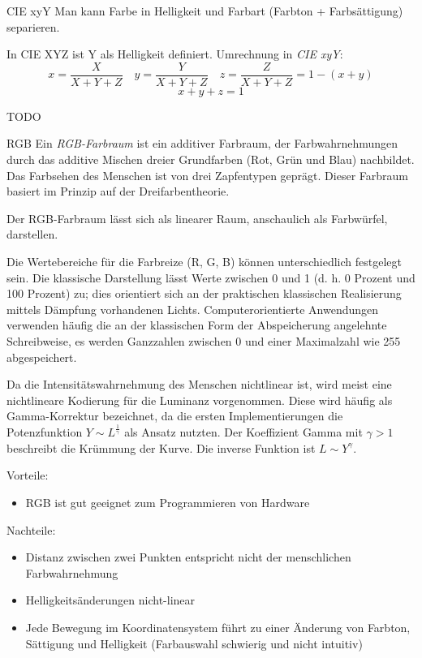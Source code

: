 \begin{bonus}[Farbmodell]{CIE xyY}
    Man kann Farbe in Helligkeit und Farbart (Farbton + Farbsättigung) separieren.

    In CIE XYZ ist Y als Helligkeit definiert.
    Umrechnung in \emph{CIE xyY}:
    \[
        x = \frac{X}{X + Y + Z} \quad
        y = \frac{Y}{X + Y + Z} \quad
        z = \frac{Z}{X + Y + Z} = 1 - (x + y)
    \]
    \[
        x + y + z = 1
    \]

    TODO
\end{bonus}

\begin{defi}[Farbmodell]{RGB}
    Ein \emph{RGB-Farbraum} ist ein additiver Farbraum, der Farbwahrnehmungen durch das additive Mischen dreier Grundfarben (Rot, Grün und Blau) nachbildet.
    Das Farbsehen des Menschen ist von drei Zapfentypen geprägt.
    Dieser Farbraum basiert im Prinzip auf der Dreifarbentheorie.

    Der RGB-Farbraum lässt sich als linearer Raum, anschaulich als Farbwürfel, darstellen.

    Die Wertebereiche für die Farbreize (R, G, B) können unterschiedlich festgelegt sein.
    Die klassische Darstellung lässt Werte zwischen 0 und 1 (d. h. 0 Prozent und 100 Prozent) zu;
    dies orientiert sich an der praktischen klassischen Realisierung mittels Dämpfung vorhandenen Lichts.
    Computerorientierte Anwendungen verwenden häufig die an der klassischen Form der Abspeicherung angelehnte Schreibweise, es werden Ganzzahlen zwischen 0 und einer Maximalzahl wie 255 abgespeichert.

    Da die Intensitätswahrnehmung des Menschen nichtlinear ist, wird meist eine nichtlineare Kodierung für die Luminanz vorgenommen. Diese wird häufig als Gamma-Korrektur bezeichnet, da die ersten Implementierungen die Potenzfunktion $Y \sim L^{\frac{1}{\gamma}}$ als Ansatz nutzten.
    Der Koeffizient Gamma mit $\gamma > 1$  beschreibt die Krümmung der Kurve.
    Die inverse Funktion ist $L \sim Y^\gamma$.

    Vorteile:
    \begin{itemize}
        \item RGB ist gut geeignet zum Programmieren von Hardware
    \end{itemize}

    Nachteile:
    \begin{itemize}
        \item Distanz zwischen zwei Punkten entspricht nicht der menschlichen Farbwahrnehmung
        \item Helligkeitsänderungen nicht-linear
        \item Jede Bewegung im Koordinatensystem führt zu einer Änderung von Farbton, Sättigung und Helligkeit (Farbauswahl schwierig und nicht intuitiv)
    \end{itemize}


\end{defi}
